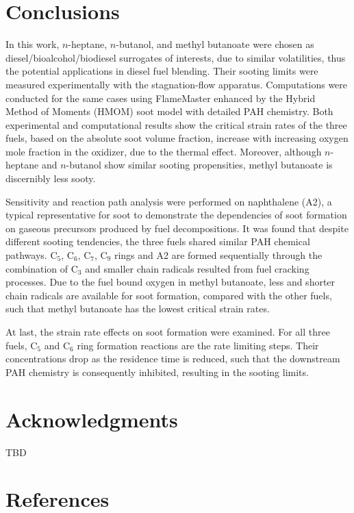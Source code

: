 \documentclass[review,3p,times]{elsarticleUS}
\begin{document}
\section{Conclusions}           

In this work, $n$-heptane, $n$-butanol, and methyl butanoate were chosen as diesel/bioalcohol/biodiesel surrogates of interests, due to similar volatilities, thus the potential applications in diesel fuel blending. Their sooting limits were measured experimentally with the stagnation-flow apparatus. Computations were conducted for the same cases using FlameMaster enhanced by the Hybrid Method of Moments (HMOM) soot model with detailed PAH chemistry. Both experimental and computational results show the critical strain rates of the three fuels, based on the absolute soot volume fraction, increase with increasing oxygen mole fraction in the oxidizer, due to the thermal effect. Moreover, although $n$-heptane and $n$-butanol show similar sooting propensities, methyl butanoate is discernibly less sooty.

Sensitivity and reaction path analysis were performed on naphthalene (A2), a typical representative for soot to demonstrate the dependencies of soot formation on gaseous precursors produced by fuel decompositions. It was found that despite different sooting tendencies, the three fuels shared similar PAH chemical pathways. C$_5$, C$_6$, C$_7$, C$_9$ rings and A2 are formed sequentially through the combination of C$_3$ and smaller chain radicals resulted from fuel cracking processes. Due to the fuel bound oxygen in methyl butanoate, less and shorter chain radicals are available for soot formation, compared with the other fuels, such that methyl butanoate has the lowest critical strain rates.

At last, the strain rate effects on soot formation were examined. For all three fuels, C$_5$ and C$_6$ ring formation reactions are the rate limiting steps. Their concentrations drop as the residence time is reduced, such that the downstream PAH chemistry is consequently inhibited, resulting in the sooting limits. 

\section*{Acknowledgments}
TBD

\section*{References}



\renewcommand{\thefigure}{\arabic{figure}}
\renewcommand{\thetable}{\arabic{table}}
\end{document}
